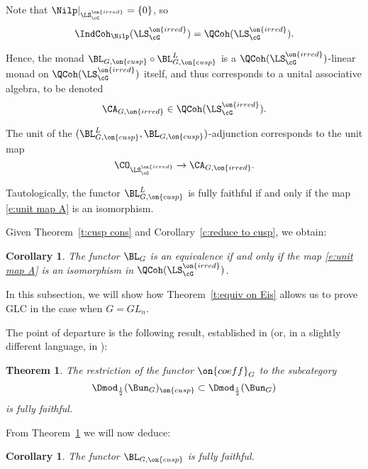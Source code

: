 \documentclass[9pt]{amsart}
\newtheorem{cor}[subsubsection]{Corollary}
\newtheorem{thm}[subsubsection]{Theorem}
\theoremstyle{remark}
\theoremstyle{definition}
\theoremstyle{remark}
\newcommand{\thmref}[1]{Theorem~\ref{#1}}
\newcommand{\corref}[1]{Corollary~\ref{#1}}
\numberwithin{equation}{section}
\begin{document}
Note that $\Nilp|_{\LS^{\on{irred}}_\cG}=\{0\}$, so 
$$\IndCoh_\Nilp(\LS^{\on{irred}}_\cG)=\QCoh(\LS^{\on{irred}}_\cG).$$

\medskip

Hence, the monad $\BL_{G,\on{cusp}}\circ \BL^L_{G,\on{cusp}}$ is a $\QCoh(\LS^{\on{irred}}_\cG)$-linear
monad on $\QCoh(\LS^{\on{irred}}_\cG)$ itself, and thus corresponds to a unital associative algebra,
to be denoted
$$\CA_{G,\on{irred}}\in \QCoh(\LS^{\on{irred}}_\cG).$$

\sssec{}

The unit of the $(\BL^L_{G,\on{cusp}},\BL_{G,\on{cusp}})$-adjunction corresponds to the unit map
\begin{equation} \label{e:unit map A}
\CO_{\LS^{\on{irred}}_\cG}\to \CA_{G,\on{irred}}.
\end{equation}

Tautologically, the functor $\BL^L_{G,\on{cusp}}$ is fully faithful if and only if the map \eqref{e:unit map A}
is an isomorphism. 

\sssec{}

Given \thmref{t:cusp cons} and \corref{c:reduce to cusp}, we obtain:

\begin{cor}  \label{c:reduce to A irred}
The functor $\BL_G$ is an equivalence if and only if the map \eqref{e:unit map A} is an isomorphism in 
$\QCoh(\LS^{\on{irred}}_\cG)$. 
\end{cor}

 \label{ss:GLn}

In this subsection, we will show how \thmref{t:equiv on Eis} allows us to prove GLC in the case when $G=GL_n$.

\sssec{}

The point of departure is the following result, established in \cite{Be1} (or, in a slightly different language, in \cite{Ga2}):

\begin{thm}  \label{t:coeff ff on cusp}
The restriction of the functor $\on{coeff}_G$ to the subcategory
$$\Dmod_{\frac{1}{2}}(\Bun_G)_{\on{cusp}}\subset \Dmod_{\frac{1}{2}}(\Bun_G)$$
is fully faithful.
\end{thm} 

\sssec{}

From \thmref{t:coeff ff on cusp} we will now deduce:

\begin{cor} \label{c:L ff on cusp}
The functor $\BL_{G,\on{cusp}}$ is fully faithful.
\end{cor}
\end{document}
